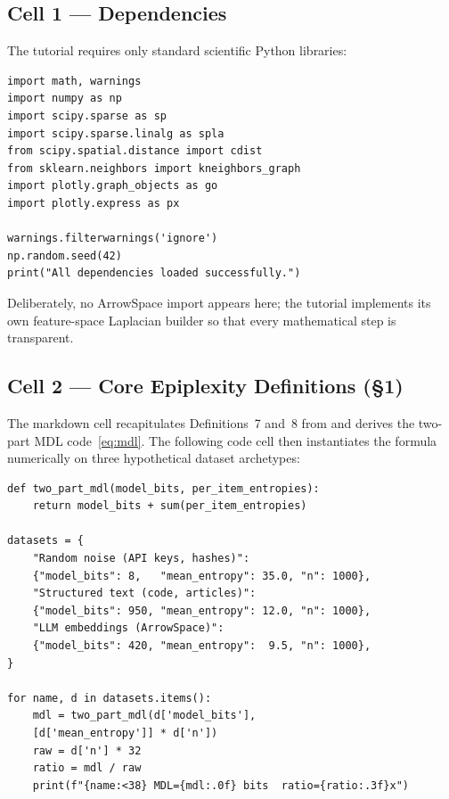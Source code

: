 \documentclass[12pt,a4paper]{article}
\theoremstyle{plain}
\theoremstyle{definition}
\theoremstyle{remark}
\newcommand{\1}{\mathbf{1}}
\begin{document}
	\subsection{Cell 1 --- Dependencies}
	
	The tutorial requires only standard scientific Python libraries:
	
	\begin{lstlisting}[caption={Tutorial notebook: dependency cell},
	label={lst:deps00}]
import math, warnings
import numpy as np
import scipy.sparse as sp
import scipy.sparse.linalg as spla
from scipy.spatial.distance import cdist
from sklearn.neighbors import kneighbors_graph
import plotly.graph_objects as go
import plotly.express as px

warnings.filterwarnings('ignore')
np.random.seed(42)
print("All dependencies loaded successfully.")
	\end{lstlisting}
	
	Deliberately, no ArrowSpace import appears here; the tutorial implements
	its own feature-space Laplacian builder so that every mathematical step
	is transparent.
	
	\subsection{Cell 2 --- Core Epiplexity Definitions (§1)}
	
	The markdown cell recapitulates Definitions~7 and~8 from
	\cite{finzi2026epiplexity} and derives the two-part MDL
	code~\eqref{eq:mdl}.
	The following code cell then instantiates the formula numerically on
	three hypothetical dataset archetypes:
	
	\begin{lstlisting}[caption={Two-part MDL toy illustration},
		label={lst:mdltoy}]
def two_part_mdl(model_bits, per_item_entropies):
	return model_bits + sum(per_item_entropies)
	
datasets = {
	"Random noise (API keys, hashes)":
	{"model_bits": 8,   "mean_entropy": 35.0, "n": 1000},
	"Structured text (code, articles)":
	{"model_bits": 950, "mean_entropy": 12.0, "n": 1000},
	"LLM embeddings (ArrowSpace)":
	{"model_bits": 420, "mean_entropy":  9.5, "n": 1000},
}

for name, d in datasets.items():
	mdl = two_part_mdl(d['model_bits'],
	[d['mean_entropy']] * d['n'])
	raw = d['n'] * 32
	ratio = mdl / raw
	print(f"{name:<38} MDL={mdl:.0f} bits  ratio={ratio:.3f}x")
	\end{lstlisting}
	
\end{document}
